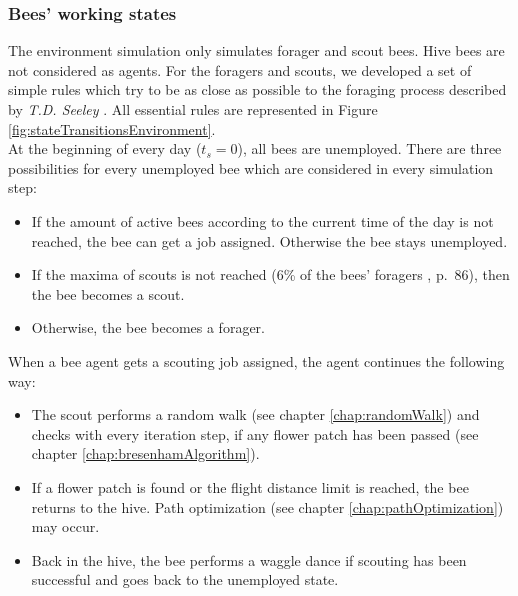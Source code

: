 		\subsubsection{Bees' working states}
			\label{chap:beesWorkingStates}
			The environment simulation only simulates forager and scout bees. Hive bees are not considered as agents. For the foragers and scouts, we developed a set of simple rules which try to be as close as possible to the foraging process described by \textit{T.D. Seeley} \cite{seeley95}. All essential rules are represented in Figure \ref{fig:stateTransitionsEnvironment}.\\
			
			
			At the beginning of every day ($t_s = 0$), all bees are unemployed. There are three possibilities for every unemployed bee which are considered in every simulation step:
			\begin{itemize}
				\item If the amount of active bees according to the current time of the day is not reached, the bee can get a job assigned. Otherwise the bee stays unemployed.
				\item If the maxima of scouts is not reached (6\% of the bees' foragers \cite*{seeley95}, p.~86), then the bee becomes a scout.
				\item Otherwise, the bee becomes a forager.\\
			\end{itemize}
			
			When a bee agent gets a scouting job assigned, the agent continues the following way:
			\begin{itemize}
				\item The scout performs a random walk (see chapter \ref{chap:randomWalk}) and checks with every iteration step, if any flower patch has been passed (see chapter \ref{chap:bresenhamAlgorithm}).
				\item If a flower patch is found or the flight distance limit is reached, the bee returns to the hive. Path optimization (see chapter \ref{chap:pathOptimization}) may occur.
				\item Back in the hive, the bee performs a waggle dance if scouting has been successful and goes back to the unemployed state.\\
			\end{itemize}
			
